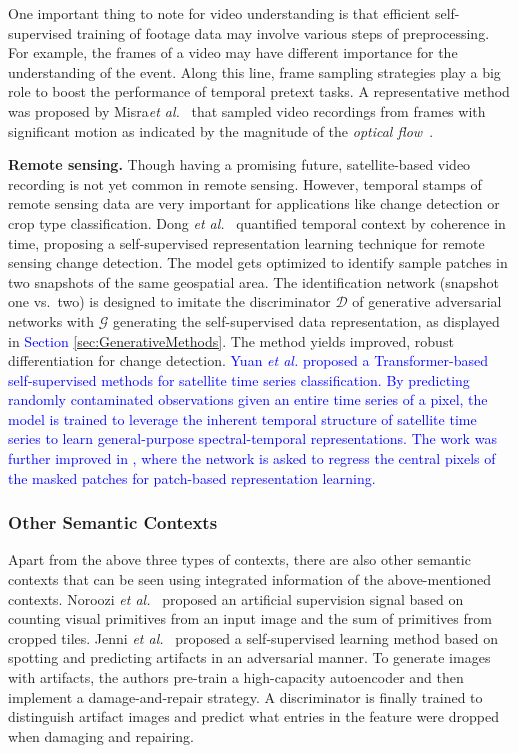 \documentclass[lettersize,journal]{IEEEtran}
\newcommand{\etal}{\textit{et al.}}
\begin{document}
One important thing to note for video understanding is that efficient self-supervised training of footage data may involve various steps of preprocessing. For example, the frames of a video may have different importance for the understanding of the event. Along this line, frame sampling strategies play a big role to boost the performance of temporal pretext tasks. A representative method was proposed by Misra\etal~\cite{misra2016shuffle} that sampled video recordings from frames with significant motion as indicated by the magnitude of the \textit{optical flow}~\cite{fortun2015optical}.
 
\textbf{Remote sensing.} Though having a promising future, satellite-based video recording is not yet common in remote sensing. However, temporal stamps of remote sensing data are very important for applications like change detection or crop type classification. Dong \etal~\cite{dong2020self} quantified temporal context by coherence in time, proposing a self-supervised representation learning technique for remote sensing change detection. The model gets optimized to identify sample patches in two snapshots of the same geospatial area. The identification network (snapshot one vs.\ two) is designed to imitate the discriminator $\mathcal{D}$ of generative adversarial networks with $\mathcal{G}$ generating the self-supervised data representation, as displayed in \textcolor{blue}{Section} \ref{sec:GenerativeMethods}. The method yields improved, robust differentiation for change detection. \textcolor{blue}{Yuan \etal \cite{yuan2020self} proposed a Transformer-based self-supervised methods for satellite time series classification. By predicting randomly contaminated observations given an entire time series of a pixel, the model is trained to leverage the inherent temporal structure of satellite time series to learn general-purpose spectral-temporal representations. The work was further improved in \cite{yuan2022sits}, where the network is asked to regress the central pixels of the masked patches for patch-based representation learning.}



\subsubsection{Other Semantic Contexts}

Apart from the above three types of contexts, there are also other semantic contexts that can be seen using integrated information of the above-mentioned contexts. Noroozi \etal~\cite{noroozi2017representation} proposed an artificial supervision signal based on counting visual primitives from an input image and the sum of primitives from cropped tiles. Jenni \etal~\cite{jenni2018self} proposed a self-supervised learning method based on spotting and predicting artifacts in an adversarial manner. To generate images with artifacts, the authors pre-train a high-capacity autoencoder and then implement a damage-and-repair strategy. A discriminator is finally trained to distinguish artifact images and predict what entries in the feature were dropped when damaging and repairing.
\end{document}
